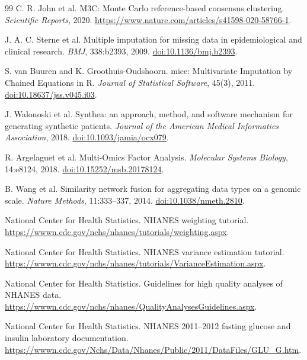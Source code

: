 \documentclass[11pt,a4paper]{article}
\begin{document}
\begin{thebibliography}{99}
C. R. John et al.
\newblock M3C: Monte Carlo reference-based consensus clustering.
\newblock \emph{Scientific Reports}, 2020.
\newblock \url{https://www.nature.com/articles/s41598-020-58766-1}.

J. A. C. Sterne et al.
\newblock Multiple imputation for missing data in epidemiological and clinical research.
\newblock \emph{BMJ}, 338:b2393, 2009.
\newblock \href{https://doi.org/10.1136/bmj.b2393}{doi:10.1136/bmj.b2393}.

S. van Buuren and K. Groothuis-Oudshoorn.
\newblock mice: Multivariate Imputation by Chained Equations in R.
\newblock \emph{Journal of Statistical Software}, 45(3), 2011.
\newblock \href{https://doi.org/10.18637/jss.v045.i03}{doi:10.18637/jss.v045.i03}.

J. Walonoski et al.
\newblock Synthea: an approach, method, and software mechanism for generating synthetic patients.
\newblock \emph{Journal of the American Medical Informatics Association}, 2018.
\newblock \href{https://doi.org/10.1093/jamia/ocx079}{doi:10.1093/jamia/ocx079}.

R. Argelaguet et al.
\newblock Multi-Omics Factor Analysis.
\newblock \emph{Molecular Systems Biology}, 14:e8124, 2018.
\newblock \href{https://doi.org/10.15252/msb.20178124}{doi:10.15252/msb.20178124}.

B. Wang et al.
\newblock Similarity network fusion for aggregating data types on a genomic scale.
\newblock \emph{Nature Methods}, 11:333--337, 2014.
\newblock \href{https://doi.org/10.1038/nmeth.2810}{doi:10.1038/nmeth.2810}.

National Center for Health Statistics.
\newblock NHANES weighting tutorial.
\newblock \url{https://wwwn.cdc.gov/nchs/nhanes/tutorials/weighting.aspx}.

National Center for Health Statistics.
\newblock NHANES variance estimation tutorial.
\newblock \url{https://wwwn.cdc.gov/nchs/nhanes/tutorials/VarianceEstimation.aspx}.

National Center for Health Statistics.
\newblock Guidelines for high quality analyses of NHANES data.
\newblock \url{https://wwwn.cdc.gov/nchs/nhanes/QualityAnalysesGuidelines.aspx}.

National Center for Health Statistics.
\newblock NHANES 2011--2012 fasting glucose and insulin laboratory documentation.
\newblock \url{https://wwwn.cdc.gov/Nchs/Data/Nhanes/Public/2011/DataFiles/GLU_G.htm}.

\end{thebibliography}
\end{document}
